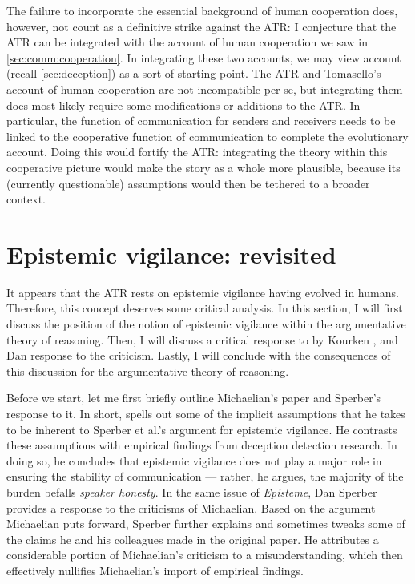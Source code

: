 The failure to incorporate the essential background of human cooperation does, however, not count as a definitive strike against the ATR: I conjecture that the ATR can be integrated with the account of human cooperation we saw in \cref{sec:comm:cooperation}. In integrating these two accounts, we may view  account (recall \cref{sec:deception}) as a sort of starting point.
The ATR and Tomasello's account of human cooperation are not incompatible per se, but integrating them does most likely require some modifications or additions to the ATR. In particular, the function of communication for senders and receivers needs to be linked to the cooperative function of communication to complete the evolutionary account.
Doing this would fortify the ATR: integrating the theory within this cooperative picture would make the story as a whole more plausible, because its (currently questionable) assumptions would then be tethered to a broader context.

\section{Epistemic vigilance: revisited}
\label{sec:EV-scrutiny}

It appears that the ATR rests on epistemic vigilance having evolved in humans. Therefore, this concept deserves some critical analysis.
In this section, I will first discuss the position of the notion of epistemic vigilance within the argumentative theory of reasoning. Then, I will discuss a critical response to \citet{Sperber10} by Kourken \citet{Michaelian13}, and Dan  response to the criticism.
Lastly, I will conclude with the consequences of this discussion for the argumentative theory of reasoning.

Before we start, let me first briefly outline Michaelian's paper and Sperber's response to it. In short, \citet{Michaelian13} spells out some of the implicit assumptions that he takes to be inherent to Sperber et al.'s argument for epistemic vigilance. He contrasts these assumptions with empirical findings from deception detection research. In doing so, he concludes that epistemic vigilance does not play a major role in ensuring the stability of communication --- rather, he argues, the majority of the burden befalls \emph{speaker honesty}. In the same \citeyear{Sperber13} issue of \emph{Episteme}, Dan Sperber provides a response to the criticisms of Michaelian. Based on the argument Michaelian puts forward, Sperber further explains and sometimes tweaks some of the claims he and his colleagues made in the original \citeyear{Sperber10} paper. He attributes a considerable portion of Michaelian's criticism to a misunderstanding, which then effectively nullifies Michaelian's import of empirical findings.

